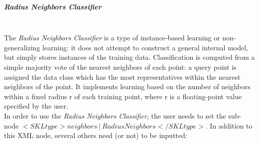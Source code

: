 \subparagraph{Radius Neighbors Classifier}
\mbox{}
\\The \textit{Radius Neighbors Classifier} is a type of instance-based learning or non-generalizing learning: it does not attempt to construct a general internal model, but simply stores instances of the training data. Classification is computed from a simple majority vote of the nearest neighbors of each point: a query point is assigned the data class which has the most representatives within the nearest neighbors of the point. It implements learning based on the number of neighbors within a fixed radius r of each training point, where r is a floating-point value specified by the user.
\\In order to use the   \textit{Radius Neighbors Classifier}, the user needs to set the sub-node $<SKLtype>neighbors~\vert~RadiusNeighbors</SKLtype>$. In addition to this XML node, several others need (or not) to be inputted:
